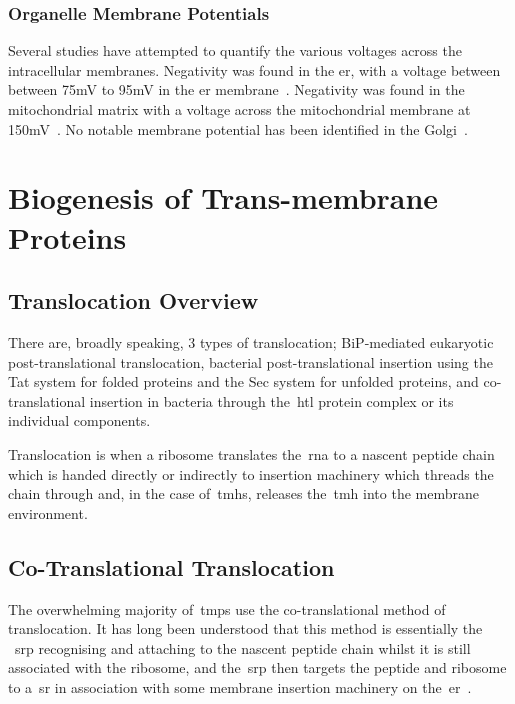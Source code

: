 \subsubsection{Organelle Membrane Potentials}

Several studies have attempted to quantify the various voltages across the intracellular membranes.
Negativity was found in the \gls{er}, with a voltage between between 75mV to 95mV in the \gls{er} membrane~\cite{Qin2011, Worley1994}.
Negativity was found in the mitochondrial matrix with a  voltage across the mitochondrial membrane at 150mV~\cite{Perry2011}.
No notable membrane potential has been identified in the Golgi~\cite{Schapiro2000, Llopis1998}.

\section{Biogenesis of Trans-membrane Proteins}
\subsection{Translocation Overview}
There are, broadly speaking, 3 types of translocation; BiP-mediated eukaryotic post-translational translocation, bacterial post-translational insertion using the Tat system for folded proteins and the Sec system for unfolded proteins, and co-translational insertion in bacteria through the~\gls{htl} protein complex or its individual components.

Translocation is when a ribosome translates the~\gls{rna} to a nascent peptide chain which is handed directly or indirectly to insertion machinery which threads the chain through and, in the case of~\gls{tmh}s, releases the~\gls{tmh} into the membrane environment.



\subsection{Co-Translational Translocation}
The overwhelming majority of~\gls{tmp}s use the co-translational method of translocation.
It has long been understood that this method is essentially the ~\gls{srp} recognising and attaching to the nascent peptide chain whilst it is still associated with the ribosome, and the~\gls{srp} then targets the peptide and ribosome to a~\gls{sr} in association with some membrane insertion machinery on the~\gls{er}~\cite{Pool2005, Hessa2005}.

